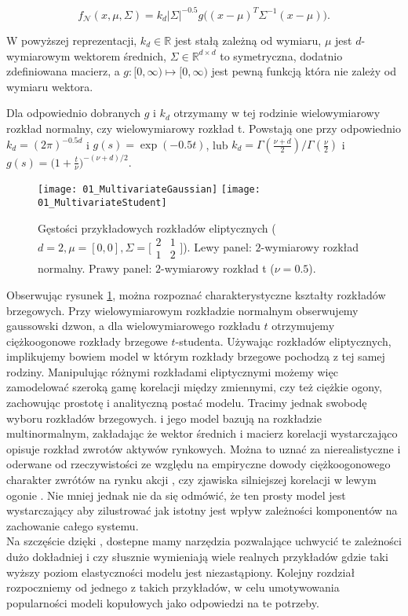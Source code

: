 $$ f_{\mathcal{N}}(x, \mu, \Sigma) = k_d \vert\Sigma\vert^{-0.5}g\big((x-\mu)^T\Sigma^{-1}(x-\mu)\big).$$

W powyższej reprezentacji, $k_d \in\mathbb{R}$ jest stałą zależną od wymiaru, $\mu$ jest $d$-wymiarowym wektorem średnich, $\Sigma \in \mathbb{R}^{d \times d}$ to symetryczna, dodatnio zdefiniowana macierz, a $g \colon [0, \infty) \mapsto [0, \infty)$ jest pewną funkcją która nie zależy od wymiaru wektora.

Dla odpowiednio dobranych $g$ i $k_d$ otrzymamy w tej rodzinie wielowymiarowy rozkład normalny, czy wielowymiarowy rozkład t. Powstają one przy odpowiednio $k_d=(2\pi)^{-0.5d}$ i $g(s) = \exp(-0.5 t)$, lub $k_d=\Gamma(\frac{\nu + d}{2})/\Gamma(\frac{\nu}{2})$ i $g(s) = \big(1 + \frac{t}{\nu})^{-(\nu + d)/2}$.
\begin{figure}[H]
	\centering
	\texttt{[image: 01\_MultivariateGaussian]}	\texttt{[image: 01\_MultivariateStudent]}
	\caption{Gęstości przykładowych rozkładów eliptycznych ($d=2, \mu=[0, 0], \Sigma = \big[\begin{smallmatrix}2&1\\1&2\end{smallmatrix}\big]$). Lewy panel: $2$-wymiarowy rozkład normalny. Prawy panel: $2$-wymiarowy rozkład t ($\nu = 0.5$).\label{fig:multivariate_gaussian_student}}
\end{figure}

Obserwując rysunek \ref{fig:multivariate_gaussian_student}, można rozpoznać charakterystyczne kształty rozkładów brzegowych. Przy wielowymiarowym rozkładzie normalnym obserwujemy gaussowski dzwon, a dla wielowymiarowego rozkładu $t$ otrzymujemy ciężkoogonowe rozkłady brzegowe $t$-studenta. Używając rozkładów eliptycznych, implikujemy bowiem model w którym rozkłady brzegowe pochodzą z tej samej rodziny. Manipulując różnymi rozkładami eliptycznymi możemy więc zamodelować szeroką gamę korelacji między zmiennymi, czy też ciężkie ogony, zachowując prostotę i analityczną postać modelu. Tracimy jednak swobodę wyboru rozkładów brzegowych. \cite{Markovitz_MPT} i jego model bazują na rozkładzie multinormalnym, zakładając że wektor średnich i macierz korelacji wystarczająco opisuje rozkład zwrotów aktywów rynkowych. Można to uznać za nierealistyczne i oderwane od rzeczywistości ze względu na empiryczne dowody ciężkoogonowego charakter zwrótów na rynku akcji \cite{Mandelbrot_NonGaussianity}, czy zjawiska silniejszej korelacji w lewym ogonie \cite{Kurowicka_Dependence_Modeling}. Nie mniej jednak nie da się odmówić, że ten prosty model jest wystarczający aby zilustrować jak istotny jest wpływ zależności komponentów na zachowanie całego systemu. \\
Na szczęście dzięki \cite{Sklar_Theorem}, dostepne mamy narzędzia pozwalające uchwycić te zależności dużo dokładniej i \cite{Cherubini_Copula_Methods_in_Finance} czy \cite{Kurowicka_Dependence_Modeling} słusznie wymieniają wiele realnych przykładów gdzie taki wyższy poziom elastyczności modelu jest niezastąpiony. Kolejny rozdział rozpoczniemy od jednego z takich przykładów, w celu umotywowania popularności modeli kopułowych jako odpowiedzi na te potrzeby.
